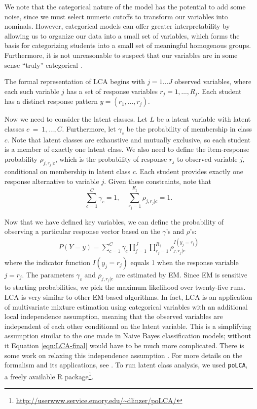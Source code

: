 \documentclass{edm_template}
\begin{document}
We note that the categorical nature of the model has the potential to add some noise, since we must select numeric cutoffs to transform our variables into nominals. However, categorical models can offer greater interpretability by allowing us to organize our data into a small set of variables, which forms the basis for categorizing students into a small set of meaningful homogenous groups. Furthermore, it is not unreasonable to suspect that our variables are in some sense ``truly'' categorical \cite[pp8--9]{Collins2009}. 

The formal representation of LCA begins with $j = 1 \ldots J$ observed variables, where each such variable $j$ has a set of response variables $r_{j} = 1,\ldots,R_{j}$. Each student has a distinct response pattern $y = (r_{1},\ldots,r_{j})$.

Now we need to consider the latent classes. Let $L$ be a latent variable with latent classes $c~=~1,\ldots,C$. Furthermore, let $\gamma_{c}$ be the probability of membership in class $c$. Note that latent classes are exhaustive and mutually exclusive, so each student is a member of exactly one latent class. We also need to define the item-response probability $\rho_{j,r_{j}|c}$, which is the probability of response $r_{j}$ to observed variable $j$, conditional on membership in latent class $c$. Each student provides exactly one response alternative to variable $j$. Given these constraints, note that
\[ \sum_{c=1}^{C} \gamma_{c} = 1,\quad \sum_{r_{j}=1}^{R_{j}} \rho_{j,r_{j}|c} = 1. \] 

Now that we have defined key variables, we can define the probability of observing a particular response vector based on the $\gamma$'s and $\rho$'s:
\begin{align}
P(Y = y) = \sum_{c=1}^{C} \gamma_{c} \prod_{j=1}^{J} \prod_{r_{j}=1}^{R_{j}} \rho_{j,r_{j}|c}^{I(y_{j} = r_{j})}
\label{eqn:LCA-final}
\end{align}
where the indicator function $I(y_{j} = r_{j})$ equals 1 when the response variable $j = r_{j}$. The parameters $\gamma_{c}$ and $\rho_{j,r_{j}|c}$ are estimated by EM. Since EM is sensitive to starting probabilities, we pick the maximum likelihood over twenty-five runs. LCA is very similar to other EM-based algorithms. In fact, LCA is an application of multivariate mixture estimation using categorical variables with an additional local independence assumption, meaning that the observed variables are independent of each other conditional on the latent variable. This is a simplifying assumption similar to the one made in Naive Bayes classification models; without it Equation \ref{eqn:LCA-final} would have to be much more complicated. There is some work on relaxing this independence assumption \cite{Hagenaars1988,Garrett2004}. For more details on the formalism and its applications, see \cite{Collins2009}. To run latent class analysis, we used \texttt{poLCA}, a freely available R package\footnote{\url{http://userwww.service.emory.edu/~dlinzer/poLCA/}}.
\end{document}
